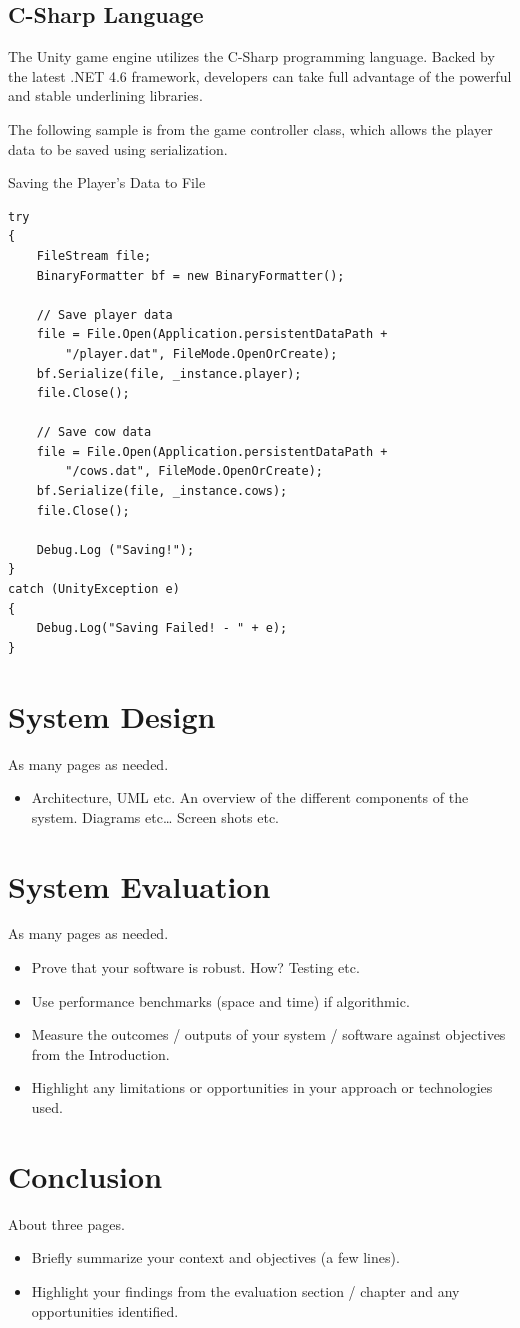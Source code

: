 \section{C-Sharp Language}
The Unity game engine utilizes the C-Sharp programming language. Backed by the latest .NET 4.6 framework, developers can take full advantage of the powerful and stable underlining libraries. 

The following sample is from the game controller class, which allows the player data to be saved using serialization. 

Saving the Player's Data to File
\begin{verbatim}
try
{
	FileStream file;
	BinaryFormatter bf = new BinaryFormatter();
	
	// Save player data
	file = File.Open(Application.persistentDataPath + 
		"/player.dat", FileMode.OpenOrCreate);
	bf.Serialize(file, _instance.player);
	file.Close();
	
	// Save cow data
	file = File.Open(Application.persistentDataPath + 
		"/cows.dat", FileMode.OpenOrCreate);
	bf.Serialize(file, _instance.cows);
	file.Close();
	
	Debug.Log ("Saving!");
}
catch (UnityException e)
{
	Debug.Log("Saving Failed! - " + e);
}
\end{verbatim}

\chapter{System Design}
As many pages as needed.
\begin{itemize}
\item Architecture, UML etc. An overview of the different components of the system. Diagrams etc… Screen shots etc.
\end{itemize}

\chapter{System Evaluation}
As many pages as needed.
\begin{itemize}
\item Prove that your software is robust. How? Testing etc. 
\item Use performance benchmarks (space and time) if algorithmic.
\item Measure the outcomes / outputs of your system / software against objectives from the Introduction.
\item Highlight any limitations or opportunities in your approach or technologies used.
\end{itemize}

\chapter{Conclusion}
About three pages.

\begin{itemize}
\item Briefly summarize your context and objectives (a few lines).
\item Highlight your findings from the evaluation section / chapter and any opportunities identified.
\end{itemize}


